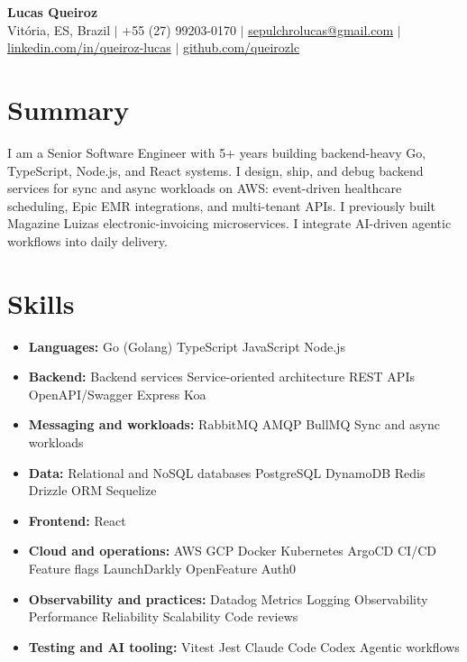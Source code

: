 \documentclass[letterpaper,10pt]{article}
\newcommand{\resumeItem}[1]{\item\small{#1}}
\newcommand{\resumeSubHeadingList}{\begin{itemize}[leftmargin=0.15in, label={}, nosep]}
\newcommand{\resumeSubHeadingListEnd}{\end{itemize}}
\begin{document}
\begin{center}
  \textbf{\Huge Lucas Queiroz} \\[3pt]
  \small Vit\'oria, ES, Brazil $|$ +55 (27) 99203-0170 $|$ \href{mailto:sepulchrolucas@gmail.com}{sepulchrolucas@gmail.com} $|$
  \href{https://linkedin.com/in/queiroz-lucas}{linkedin.com/in/queiroz-lucas} $|$
  \href{https://github.com/queirozlc}{github.com/queirozlc}
\end{center}
\vspace{2pt}

\section{Summary}
I am a Senior Software Engineer with 5+ years building backend-heavy Go, TypeScript, Node.js, and React systems. I design, ship, and debug backend services for sync and async workloads on AWS: event-driven healthcare scheduling, Epic EMR integrations, and multi-tenant APIs. I previously built Magazine Luiza\textquotesingle{}s electronic-invoicing microservices. I integrate AI-driven agentic workflows into daily delivery.

\section{Skills}
\resumeSubHeadingList
\resumeItem{\textbf{Languages:} Go (Golang) \textbar{} TypeScript \textbar{} JavaScript \textbar{} Node.js}
\resumeItem{\textbf{Backend:} Backend services \textbar{} Service-oriented architecture \textbar{} REST APIs \textbar{} OpenAPI/Swagger \textbar{} Express \textbar{} Koa}
\resumeItem{\textbf{Messaging and workloads:} RabbitMQ \textbar{} AMQP \textbar{} BullMQ \textbar{} Sync and async workloads}
\resumeItem{\textbf{Data:} Relational and NoSQL databases \textbar{} PostgreSQL \textbar{} DynamoDB \textbar{} Redis \textbar{} Drizzle ORM \textbar{} Sequelize}
\resumeItem{\textbf{Frontend:} React}
\resumeItem{\textbf{Cloud and operations:} AWS \textbar{} GCP \textbar{} Docker \textbar{} Kubernetes \textbar{} ArgoCD \textbar{} CI/CD \textbar{} Feature flags \textbar{} LaunchDarkly \textbar{} OpenFeature \textbar{} Auth0}
\resumeItem{\textbf{Observability and practices:} Datadog \textbar{} Metrics \textbar{} Logging \textbar{} Observability \textbar{} Performance \textbar{} Reliability \textbar{} Scalability \textbar{} Code reviews}
\resumeItem{\textbf{Testing and AI tooling:} Vitest \textbar{} Jest \textbar{} Claude Code \textbar{} Codex \textbar{} Agentic workflows}\resumeSubHeadingListEnd
\end{document}
